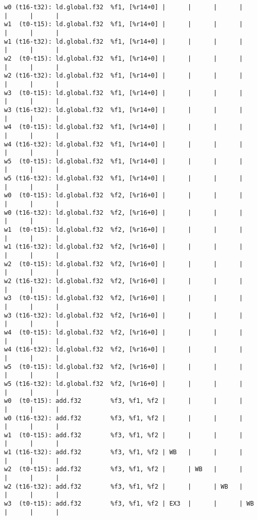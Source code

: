 \documentclass[11pt]{article}
\begin{document}
\begin{Answer}
\begin{verbatim}
w0 (t16-t32): ld.global.f32  %f1, [%r14+0] |      |      |      |      |      |      |
w1  (t0-t15): ld.global.f32  %f1, [%r14+0] |      |      |      |      |      |      |
w1 (t16-t32): ld.global.f32  %f1, [%r14+0] |      |      |      |      |      |      |
w2  (t0-t15): ld.global.f32  %f1, [%r14+0] |      |      |      |      |      |      |
w2 (t16-t32): ld.global.f32  %f1, [%r14+0] |      |      |      |      |      |      |
w3  (t0-t15): ld.global.f32  %f1, [%r14+0] |      |      |      |      |      |      |
w3 (t16-t32): ld.global.f32  %f1, [%r14+0] |      |      |      |      |      |      |
w4  (t0-t15): ld.global.f32  %f1, [%r14+0] |      |      |      |      |      |      |
w4 (t16-t32): ld.global.f32  %f1, [%r14+0] |      |      |      |      |      |      |
w5  (t0-t15): ld.global.f32  %f1, [%r14+0] |      |      |      |      |      |      |
w5 (t16-t32): ld.global.f32  %f1, [%r14+0] |      |      |      |      |      |      |
w0  (t0-t15): ld.global.f32  %f2, [%r16+0] |      |      |      |      |      |      |
w0 (t16-t32): ld.global.f32  %f2, [%r16+0] |      |      |      |      |      |      |
w1  (t0-t15): ld.global.f32  %f2, [%r16+0] |      |      |      |      |      |      |
w1 (t16-t32): ld.global.f32  %f2, [%r16+0] |      |      |      |      |      |      |
w2  (t0-t15): ld.global.f32  %f2, [%r16+0] |      |      |      |      |      |      |
w2 (t16-t32): ld.global.f32  %f2, [%r16+0] |      |      |      |      |      |      |
w3  (t0-t15): ld.global.f32  %f2, [%r16+0] |      |      |      |      |      |      |
w3 (t16-t32): ld.global.f32  %f2, [%r16+0] |      |      |      |      |      |      |
w4  (t0-t15): ld.global.f32  %f2, [%r16+0] |      |      |      |      |      |      |
w4 (t16-t32): ld.global.f32  %f2, [%r16+0] |      |      |      |      |      |      |
w5  (t0-t15): ld.global.f32  %f2, [%r16+0] |      |      |      |      |      |      |
w5 (t16-t32): ld.global.f32  %f2, [%r16+0] |      |      |      |      |      |      |
w0  (t0-t15): add.f32        %f3, %f1, %f2 |      |      |      |      |      |      |
w0 (t16-t32): add.f32        %f3, %f1, %f2 |      |      |      |      |      |      |
w1  (t0-t15): add.f32        %f3, %f1, %f2 |      |      |      |      |      |      |
w1 (t16-t32): add.f32        %f3, %f1, %f2 | WB   |      |      |      |      |      |
w2  (t0-t15): add.f32        %f3, %f1, %f2 |      | WB   |      |      |      |      |
w2 (t16-t32): add.f32        %f3, %f1, %f2 |      |      | WB   |      |      |      |
w3  (t0-t15): add.f32        %f3, %f1, %f2 | EX3  |      |      | WB   |      |      |

\end{verbatim}
\end{Answer}
\end{document}
